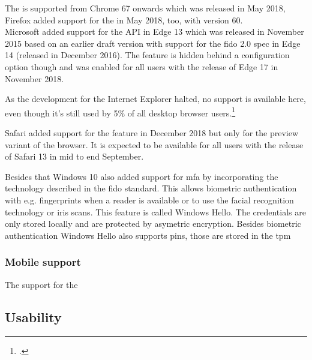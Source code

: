 The \wa{} is supported from Chrome 67 onwards which was released in May 2018, Firefox added support for the \wa{} in May 2018, too, with version 60.\\
Microsoft added support for the API in Edge 13 which was released in November 2015 based on an earlier draft version with support for the \gls{fido} 2.0 spec in Edge 14 (released in December 2016). The feature is hidden behind a configuration option though and was enabled for all users with the release of Edge 17 in November 2018.

As the development for the Internet Explorer halted, no support is available here, even though it's still used by 5\% of all desktop browser users.\footcite[See]{TODO}

Safari added support for the \wa{} feature in December 2018 but only for the preview variant of the browser. It is expected to be available for all users with the release of Safari 13 in mid to end September.

Besides that Windows 10 also added support for \gls{mfa} by incorporating the technology described in the \gls{fido} standard. This allows biometric authentication with e.g. fingerprints when a reader is available or to use the facial recognition technology or iris scans. This feature is called \frqq Windows Hello\flqq{}. The credentials are only stored locally and are protected by asymetric encryption. Besides biometric authentication Windows Hello also supports \glspl{pin}, those are stored in the \gls{tpm}

\subsubsection{Mobile support}

The support for the \wa{} 

\subsection{Usability}